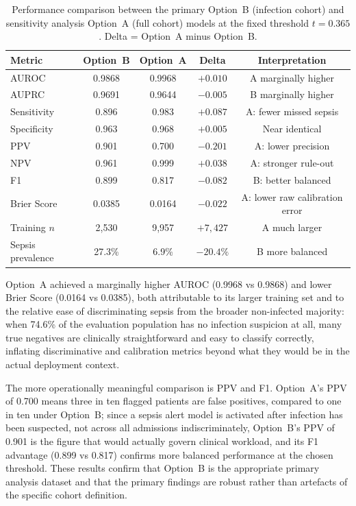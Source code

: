 \documentclass[final,3p,times]{elsarticle}
\begin{document}
\begin{table}[htbp]
\centering
\caption{Performance comparison between the primary Option~B
(infection cohort) and sensitivity analysis Option~A (full cohort)
models at the fixed threshold $t = 0.365$. Delta = Option~A minus
Option~B.}
\label{tab:sensitivity}
\small
\begin{tabular}{lcccc}
\toprule
\textbf{Metric} & \textbf{Option~B} & \textbf{Option~A} &
\textbf{Delta} & \textbf{Interpretation} \\
\midrule
AUROC            & 0.9868 & 0.9968 & $+0.010$ & A marginally higher \\
AUPRC            & 0.9691 & 0.9644 & $-0.005$ & B marginally higher \\
Sensitivity      & 0.896  & 0.983  & $+0.087$ & A: fewer missed sepsis \\
Specificity      & 0.963  & 0.968  & $+0.005$ & Near identical \\
PPV              & 0.901  & 0.700  & $-0.201$ & A: lower precision \\
NPV              & 0.961  & 0.999  & $+0.038$ & A: stronger rule-out \\
F1               & 0.899  & 0.817  & $-0.082$ & B: better balanced \\
Brier Score      & 0.0385 & 0.0164 & $-0.022$ & A: lower raw calibration error \\
Training $n$     & 2,530  & 9,957  & $+7,427$ & A much larger \\
Sepsis prevalence & 27.3\% & 6.9\% & $-20.4\%$ & B more balanced \\
\bottomrule
\end{tabular}
\end{table}
 
Option~A achieved a marginally higher AUROC (0.9968 vs 0.9868) and
lower Brier Score (0.0164 vs 0.0385), both attributable to its larger
training set and to the relative ease of discriminating sepsis from the
broader non-infected majority: when 74.6\% of the evaluation population
has no infection suspicion at all, many true negatives are clinically
straightforward and easy to classify correctly, inflating discriminative
and calibration metrics beyond what they would be in the actual
deployment context.

The more operationally meaningful comparison is PPV and F1. Option~A's
PPV of 0.700 means three in ten flagged patients are false positives,
compared to one in ten under Option~B; since a sepsis alert model is
activated after infection has been suspected, not across all admissions
indiscriminately, Option~B's PPV of 0.901 is the figure that would
actually govern clinical workload, and its F1 advantage (0.899 vs 0.817)
confirms more balanced performance at the chosen threshold. These
results confirm that Option~B is the appropriate primary analysis
dataset and that the primary findings are robust rather than artefacts
of the specific cohort definition.
 
\end{document}
